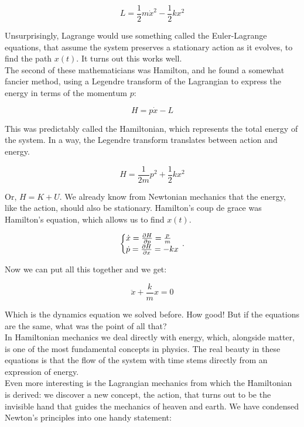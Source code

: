 \documentclass[krantz1,ChapterTOCs]{krantz}
\begin{document}
$$L = \frac{1}{2}m\dot{x}^2 - \frac{1}{2}kx^2$$

Unsurprisingly, Lagrange would use something called the Euler-Lagrange equations, that assume the system preserves a stationary action as it evolves, to find the path $x(t)$. It turns out this works well.\\

The second of these mathematicians was Hamilton, and he found a somewhat fancier method, using a Legendre transform of the Lagrangian to express the energy in terms of the momentum $p$:

$$H = p\dot{x} - L$$

This was predictably called the Hamiltonian, which represents the total energy of the system. In a way, the Legendre transform translates between action and energy.

$$H = \frac{1}{2m}p^2 + \frac{1}{2}kx^2$$

Or, $H = K + U$. We already know from Newtonian mechanics that the energy, like the action, should also be stationary. Hamilton's coup de grace was Hamilton's equation, which allows us to find $x(t)$.

\begin{equation}
  \left\{\begin{array}{@{}l@{}}
    \dot{x}=\frac{\partial H}{\partial p} = \frac{p}{m} \\
    \dot{p}=\frac{\partial H}{\partial x} = -kx
  \end{array}\right.\,.
\end{equation}

Now we can put all this together and we get:

$$\ddot{x} + \frac{k}{m}x = 0$$

Which is the dynamics equation we solved before. How good! But if the equations are the same, what was the point of all that?\\

In Hamiltonian mechanics we deal directly with energy, which, alongside matter, is one of the most fundamental concepts in physics. The real beauty in these equations is that the flow of the system with time stems directly from an expression of energy.\\

Even more interesting is the Lagrangian mechanics from which the Hamiltonian is derived: we discover a new concept, the action, that turns out to be the invisible hand that guides the mechanics of heaven and earth. We have condensed Newton's principles into one handy statement:\\
\end{document}
